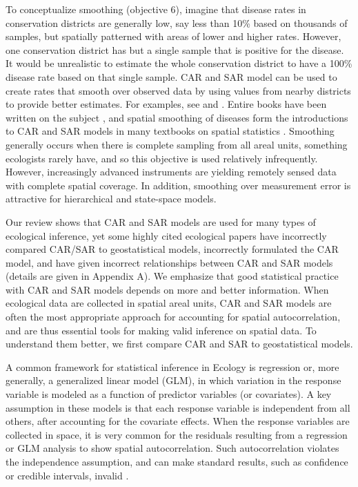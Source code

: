 To conceptualize smoothing (objective 6), imagine that disease rates in conservation districts are generally low, say less than 10\% based on thousands of samples, but spatially patterned with areas of lower and higher rates.  However, one conservation district has but a single sample that is positive for the disease.  It would be unrealistic to estimate the whole conservation district to have a 100\% disease rate based on that single sample. CAR and SAR model can be used to create rates that smooth over observed data by using values from nearby districts to provide better estimates. For examples, see \citet{Begu:Mart:Rue:Cumm:hier:2012} and \citet{Evan:Kirc:Eyle:Ryan:Walt:habi:2016}. Entire books have been written on the subject \citep[e.g.,][]{Elli:Wake:Best:Brig:2000,Pfei:Robi:Stev:Stev:Roge:spat:2008,Laws:stat:2013}, and spatial smoothing of diseases form the introductions to CAR and SAR models in many textbooks on spatial statistics \citep{Cres:stat:1993,Wall:Gotw:appl:2004, Scha:Gotw:stat:2005, Bane:Carl:Gelf:hier:2014}.  Smoothing generally occurs when there is complete sampling from all areal units, something ecologists rarely have, and so this objective is used relatively infrequently. However, increasingly advanced instruments \citep[e.g., LIDAR, ][]{Camp:Wynn:intr:2011} are yielding remotely sensed data with complete spatial coverage.  In addition, smoothing over measurement error is attractive for hierarchical \citep{Cres:Cald:Clar:VerH:acco:2009} and state-space \citep{deVa:Hast:fitt:2002} models.

Our review shows that CAR and SAR models are used for many types of ecological inference, yet some highly cited ecological papers have incorrectly compared CAR/SAR to geostatistical models, incorrectly formulated the CAR model, and have given incorrect relationships between CAR and SAR models (details are given in Appendix A). We emphasize that good statistical practice with CAR and SAR models depends on more and better information.  When ecological data are collected in spatial areal units, CAR and SAR models are often the most appropriate approach for accounting for spatial autocorrelation, and are thus essential tools for making valid inference on spatial data.   To understand them better, we first compare CAR and SAR to geostatistical models.

A common framework for statistical inference in Ecology is regression or, more generally, a generalized linear model (GLM), in which variation in the response variable is modeled as a function of predictor variables (or covariates).  A key assumption in these models is that each response variable is independent from all others, after accounting for the covariate effects.  When the response variables are collected in space, it is very common for the residuals resulting from a regression or GLM analysis to show spatial autocorrelation.  Such autocorrelation violates the independence assumption, and can make standard results, such as confidence or credible intervals, invalid \citep{Clif:Ord:spat:1981,Lege:spat:1993}. 

